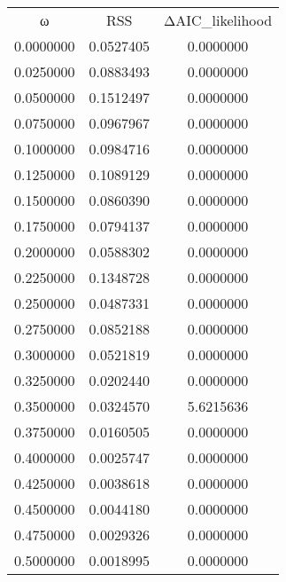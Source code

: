 \begin{tabular}{ccc}
ω & RSS & ΔAIC_likelihood\\
0.0000000 & 0.0527405 & 0.0000000\\
0.0250000 & 0.0883493 & 0.0000000\\
0.0500000 & 0.1512497 & 0.0000000\\
0.0750000 & 0.0967967 & 0.0000000\\
0.1000000 & 0.0984716 & 0.0000000\\
0.1250000 & 0.1089129 & 0.0000000\\
0.1500000 & 0.0860390 & 0.0000000\\
0.1750000 & 0.0794137 & 0.0000000\\
0.2000000 & 0.0588302 & 0.0000000\\
0.2250000 & 0.1348728 & 0.0000000\\
0.2500000 & 0.0487331 & 0.0000000\\
0.2750000 & 0.0852188 & 0.0000000\\
0.3000000 & 0.0521819 & 0.0000000\\
0.3250000 & 0.0202440 & 0.0000000\\
0.3500000 & 0.0324570 & 5.6215636\\
0.3750000 & 0.0160505 & 0.0000000\\
0.4000000 & 0.0025747 & 0.0000000\\
0.4250000 & 0.0038618 & 0.0000000\\
0.4500000 & 0.0044180 & 0.0000000\\
0.4750000 & 0.0029326 & 0.0000000\\
0.5000000 & 0.0018995 & 0.0000000\\
\end{tabular}

